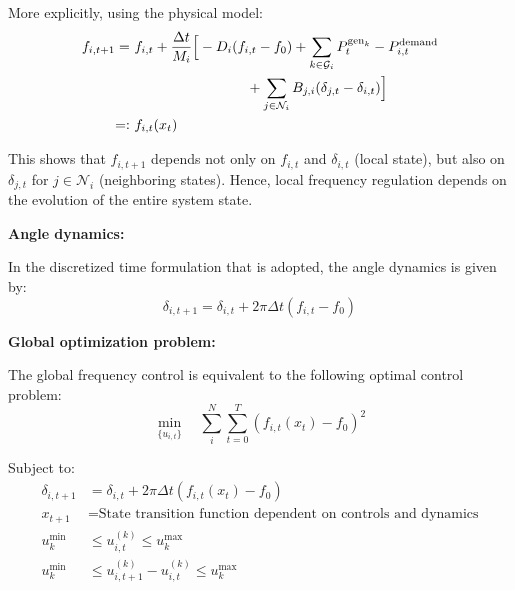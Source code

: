 \documentclass{article}
\begin{document}
More explicitly, using the physical model:
\begin{align}
    f_{i,t+1} =\ & f_{i,t} + \frac{\Delta t}{M_i} \Big[ -D_i(f_{i,t} - f_0) 
    + \sum_{k \in \mathcal{G}_i} P^{\text{gen}_k}_t 
    - P^{\text{demand}}_{i,t} \notag \\
    &\qquad\qquad\qquad\qquad
    + \sum_{j \in \mathcal{N}_i} B_{j,i}(\delta_{j,t} - \delta_{i,t}) \Big] \\
    =:\ & f_{i,t}(x_t)
\end{align}

This shows that $f_{i,t+1}$ depends not only on $f_{i,t}$ and $\delta_{i,t}$ (local state), but also on $\delta_{j,t}$ for $j \in \mathcal{N}_i$ (neighboring states). Hence, local frequency regulation depends on the evolution of the entire system state.

\textbf{Angle dynamics:}

In the discretized time formulation that is adopted, the angle dynamics is given by:
\begin{equation}
    \delta_{i,t+1} = \delta_{i,t} + 2\pi \Delta t (f_{i,t} - f_0)
\end{equation}

\textbf{Global optimization problem:}

The global frequency control is equivalent to the following optimal control problem:
\begin{equation}
\min_{\{u_{i,t}\}} \quad \sum_i^N \sum_{t=0}^{T} \left( f_{i,t}(x_t) - f_0 \right)^2
\end{equation}

Subject to:
\begin{align}
    \delta_{i,t+1} &= \delta_{i,t} + 2\pi \Delta t (f_{i,t}(x_t) - f_0) \\
    x_{t+1} &= \text{State transition function dependent on controls and dynamics} \\
    u^{\min}_k &\leq u_{i,t}^{(k)} \leq u^{\max}_k \\
    u^{\min}_k &\leq u_{i,t+1}^{(k)} - u_{i,t}^{(k)} \leq u^{\max}_k
\end{align}
\end{document}

